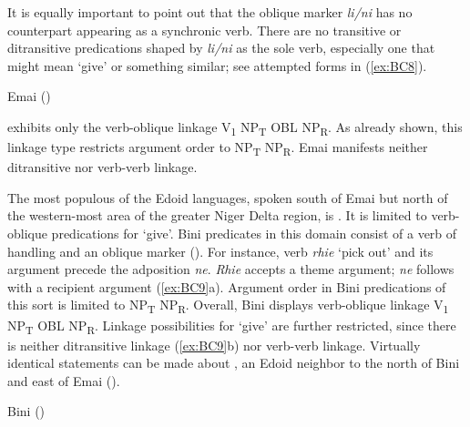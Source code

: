 \documentclass[output=paper,colorlinks,citecolor=brown]{langscibook}
\begin{document}
It is equally important to point out that the oblique marker \textit{li/ni} has no counterpart appearing as a synchronic verb. There are no transitive or ditransitive predications shaped by \textit{li/ni} as the sole verb, especially one that might mean ‘give’ or something similar; see attempted forms in (\ref{ex:BC8}).

\ea \label{ex:BC8} Emai (\citealt[518-525]{SchaeferEgbokhare2007})
\begin{xlist}
\end{xlist}
\z

 exhibits only the verb-oblique linkage V\textsubscript{1} NP\textsubscript{T} OBL NP\textsubscript{R}. As already shown, this linkage type restricts argument order to NP\textsubscript{T} NP\textsubscript{R}. Emai manifests neither ditransitive nor verb-verb linkage.

The most populous of the Edoid languages, spoken south of Emai but north of the western-most area of the greater Niger Delta region, is . It is limited to verb-oblique predications for ‘give’. Bini predicates in this domain consist of a verb of handling and an oblique marker (\cite{Agheyisi1990}). For instance, verb \textit{rhie} ‘pick out’ and its argument precede the adposition \textit{ne}. \textit{Rhie} accepts a theme argument; \textit{ne} follows with a recipient argument (\ref{ex:BC9}a). Argument order  in Bini predications of this sort is limited to NP\textsubscript{T} NP\textsubscript{R}. Overall, Bini displays verb-oblique linkage V\textsubscript{1} NP\textsubscript{T} OBL NP\textsubscript{R}. Linkage possibilities for ‘give’ are further restricted, since there is neither ditransitive linkage (\ref{ex:BC9}b) nor verb-verb linkage. Virtually identical statements can be made about , an Edoid neighbor to the north of Bini and east of Emai (\cite{Ejele1986}).

\ea \label{ex:BC9} Bini (\cite[92]{Agheyisi1990})
\begin{xlist}
\end{xlist}
\z
\end{document}
